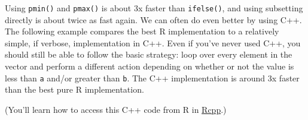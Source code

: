 Using \texttt{pmin()} and \texttt{pmax()} is about 3x faster than
\texttt{ifelse()}, and using subsetting directly is about twice as fast
again. We can often do even better by using C++. The following example
compares the best R implementation to a relatively simple, if verbose,
implementation in C++. Even if you've never used C++, you should still
be able to follow the basic strategy: loop over every element in the
vector and perform a different action depending on whether or not the
value is less than \texttt{a} and/or greater than \texttt{b}. The C++
implementation is around 3x faster than the best pure R implementation.

\begin{Shaded}
\begin{Highlighting}[]
  

  
   

   \NormalTok{(} 
     
     
    \NormalTok{\} }  
    \NormalTok{\} } \NormalTok{\{}
    \NormalTok{\}}
  \NormalTok{\}}

   
\NormalTok{\}}
\end{Highlighting}
\end{Shaded}

(You'll learn how to access this C++ code from R in
\hyperref[rcpp]{Rcpp}.)

\begin{Shaded}
\begin{Highlighting}[]
\NormalTok{(}
   \NormalTok{, }\NormalTok{),}
   \NormalTok{, }\NormalTok{),}
   
\NormalTok{)}
\end{Highlighting}
\end{Shaded}

